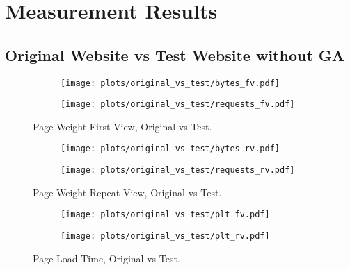 \section{Measurement Results}

\subsection{Original Website vs Test Website without GA}

\begin{figure}
	\centering
	\begin{subfigure}{.5\textwidth}
		\centering
		\texttt{[image: plots/original\_vs\_test/bytes\_fv.pdf]}
		\label{fig:sub1}
	\end{subfigure}%
	\begin{subfigure}{.5\textwidth}
		\centering
		\texttt{[image: plots/original\_vs\_test/requests\_fv.pdf]}
		\label{fig:sub2}
	\end{subfigure}
	\caption{Page Weight First View, Original vs Test.}
	\label{figure:plt_original_test}
\end{figure}

\begin{figure}
	\centering
	\begin{subfigure}{.5\textwidth}
		\centering
		\texttt{[image: plots/original\_vs\_test/bytes\_rv.pdf]}
		\label{fig:sub1}
	\end{subfigure}%
	\begin{subfigure}{.5\textwidth}
		\centering
		\texttt{[image: plots/original\_vs\_test/requests\_rv.pdf]}
		\label{fig:sub2}
	\end{subfigure}
	\caption{Page Weight Repeat View, Original vs Test.}
	\label{figure:plt_original_test}
\end{figure}


\begin{figure}
	\centering
	\begin{subfigure}{.5\textwidth}
		\centering
		\texttt{[image: plots/original\_vs\_test/plt\_fv.pdf]}
		\label{fig:sub1}
	\end{subfigure}%
	\begin{subfigure}{.5\textwidth}
		\centering
		\texttt{[image: plots/original\_vs\_test/plt\_rv.pdf]}
		\label{fig:sub2}
	\end{subfigure}
	\caption{Page Load Time, Original vs Test.}
	\label{figure:plt_original_test}
\end{figure}


